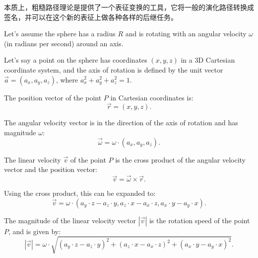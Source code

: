 \documentclass[11pt]{article}
\begin{document}
本质上，粗糙路径理论是提供了一个表征变换的工具，它将一般的演化路径转换成签名，并可以在这个新的表征上做各种各样的后继任务。

\newpage

Let's assume the sphere has a radius $R$ and is rotating with an angular velocity $\omega$ (in radians per second) around an axis.

Let's say a point on the sphere has coordinates $(x, y, z)$ in a 3D Cartesian coordinate system, and the axis of rotation is defined by the unit vector $\vec{a} = (a_x, a_y, a_z)$, where $a_x^2 + a_y^2 + a_z^2 = 1$.

The position vector of the point $P$ in Cartesian coordinates is:
\begin{equation}
\vec{r} = (x, y, z).
\end{equation}

The angular velocity vector is in the direction of the axis of rotation and has magnitude $\omega$:
\begin{equation}
\vec{\omega} = \omega \cdot (a_x, a_y, a_z).
\end{equation}

The linear velocity $\vec{v}$ of the point $P$ is the cross product of the angular velocity vector and the position vector:
\begin{equation}
\vec{v} = \vec{\omega} \times \vec{r}.
\end{equation}

Using the cross product, this can be expanded to:
\begin{equation}
\vec{v} = \omega \cdot (a_y \cdot z - a_z \cdot y, a_z \cdot x - a_x \cdot z, a_x \cdot y - a_y \cdot x).
\end{equation}

The magnitude of the linear velocity vector $|\vec{v}|$ is the rotation speed of the point $P$, and is given by:
\begin{equation}
|\vec{v}| = \omega \cdot \sqrt{(a_y \cdot z - a_z \cdot y)^2 + (a_z \cdot x - a_x \cdot z)^2 + (a_x \cdot y - a_y \cdot x)^2}.
\end{equation}

{}


\end{document}
